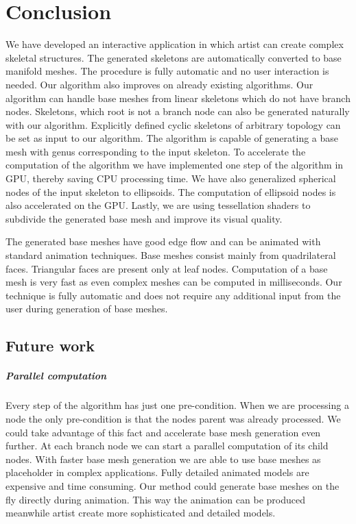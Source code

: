 \chapter{Conclusion}

We have developed an interactive application in which artist can create complex skeletal structures.
The generated skeletons are automatically converted to base manifold meshes.
The procedure is fully automatic and no user interaction is needed.
Our algorithm also improves on already existing algorithms.
Our algorithm can handle base meshes from linear skeletons which do not have branch nodes.
Skeletons, which root is not a branch node can also be generated naturally with our algorithm.
Explicitly defined cyclic skeletons of arbitrary topology can be set as input to our algorithm.
The algorithm is capable of generating a base mesh with genus corresponding to the input skeleton.
To accelerate the computation of the algorithm we have implemented one step of the algorithm in GPU, thereby saving CPU processing time.
We have also generalized spherical nodes of the input skeleton to ellipsoids.
The computation of ellipsoid nodes is also accelerated on the GPU.
Lastly, we are using tessellation shaders to subdivide the generated base mesh and improve its visual quality.

The generated base meshes have good edge flow and can be animated with standard animation techniques.
Base meshes consist mainly from quadrilateral faces.
Triangular faces are present only at leaf nodes.
Computation of a base mesh is very fast as even complex meshes can be computed in milliseconds.
Our technique is fully automatic and does not require any additional input from the user during generation of base meshes.

\section{Future work}

\paragraph{Parallel computation}
Every step of the algorithm has just one pre-condition.
When we are processing a node the only pre-condition is that the nodes parent was already processed.
We could take advantage of this fact and accelerate base mesh generation even further.
At each branch node we can start a parallel computation of its child nodes.
With faster base mesh generation we are able to use base meshes as placeholder in complex applications.
Fully detailed animated models are expensive and time consuming.
Our method could generate base meshes on the fly directly during animation.
This way the animation can be produced meanwhile artist create more sophisticated and detailed models.

